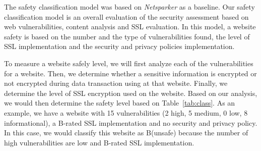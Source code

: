\documentclass[conference]{IEEEtran}
\begin{document}
The safety classification model was based on \emph{Netsparker} as
a baseline. Our safety classification model is an overall evaluation of the
security assessment based on web vulnerabilities, content analysis and SSL evaluation. 
In this model, a website safety is based on the number and the type of
vulnerabilities found, the level of SSL implementation and 
the security and privacy policies implementation.

To measure a website safely level, we will first analyze each of
the vulnerabilities for a website. Then, we determine
whether a sensitive information is encrypted or not encrypted during data transaction using at that website. Finally, we 
determine the level of SSL encryption used on the website. Based on our
analysis, we would then
determine the safety level based on Table~\ref{tab:class}. As an example, 
we have a website with 
15 vulnerabilities (2 high, 5 medium, 0 low, 8 informational), a B-rated SSL implementation and no security and privacy policy. In this case, we would classify this website as B(unsafe) because the number of high vulnerabilities are low and B-rated SSL implementation. 
\end{document}
